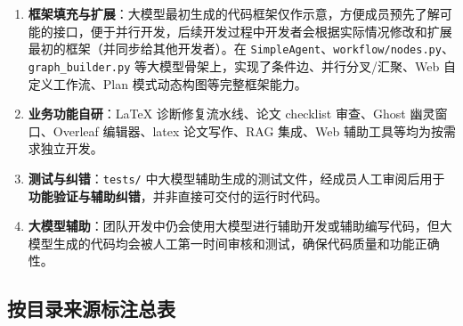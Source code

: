 \begin{enumerate}[leftmargin=2em]
    \item \textbf{框架填充与扩展}：大模型最初生成的代码框架仅作示意，方便成员预先了解可能的接口，便于并行开发，后续开发过程中开发者会根据实际情况修改和扩展最初的框架（并同步给其他开发者）。在 \texttt{SimpleAgent}、\texttt{workflow/nodes.py}、\texttt{graph\_builder.py} 等大模型骨架上，实现了条件边、并行分叉/汇聚、Web 自定义工作流、Plan 模式动态构图等完整框架能力。
    \item \textbf{业务功能自研}：LaTeX 诊断修复流水线、论文 checklist 审查、Ghost 幽灵窗口、Overleaf 编辑器、latex 论文写作、RAG 集成、Web 辅助工具等均为按需求独立开发。
    \item \textbf{测试与纠错}：\texttt{tests/} 中大模型辅助生成的测试文件，经成员人工审阅后用于\textbf{功能验证与辅助纠错}，并非直接可交付的运行时代码。
    \item \textbf{大模型辅助}：团队开发中仍会使用大模型进行辅助开发或辅助编写代码，但大模型生成的代码均会被人工第一时间审核和测试，确保代码质量和功能正确性。
\end{enumerate}

\subsection{按目录来源标注总表}

